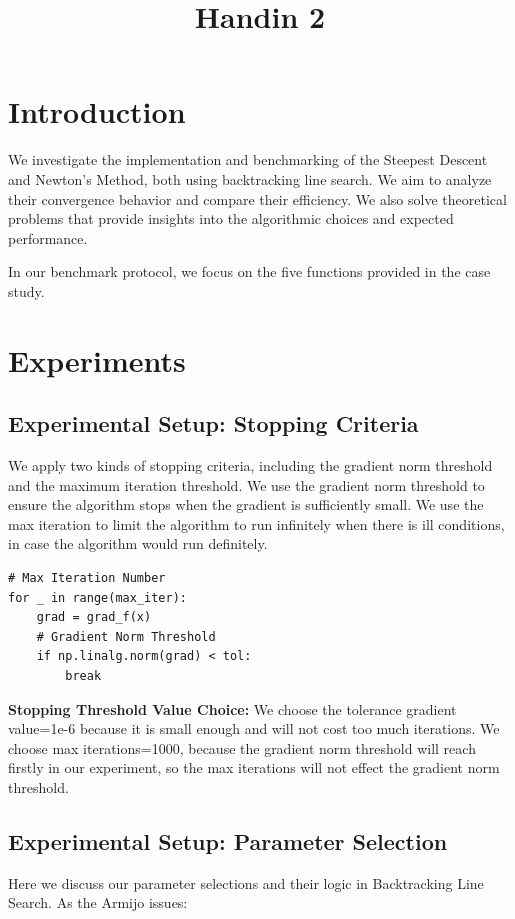 \documentclass[12pt]{article}
\title{Handin 2}
\begin{document}
\maketitle

\section{Introduction}

We investigate the implementation and benchmarking of the Steepest Descent and Newton's Method, both using backtracking line search. We aim to analyze their convergence behavior and compare their efficiency.  We also solve theoretical problems that provide insights into the algorithmic choices and expected performance. 

In our benchmark protocol, we focus on the five functions provided in the case study. 

\section{Experiments}

\subsection{Experimental Setup: Stopping Criteria}
We apply two kinds of stopping criteria, including the gradient norm threshold and the maximum iteration threshold. We use the gradient norm threshold to ensure the algorithm stops when the gradient is sufficiently small. We use the max iteration to limit the algorithm to run infinitely when there is ill conditions, in case the algorithm would run definitely.

\begin{lstlisting}
# Max Iteration Number
for _ in range(max_iter): 
    grad = grad_f(x)
    # Gradient Norm Threshold 
    if np.linalg.norm(grad) < tol:
        break
\end{lstlisting}

\textbf{Stopping Threshold Value Choice: }We choose the tolerance gradient value=1e-6 because it is small enough and will not cost too much iterations. We choose max iterations=1000, because the gradient norm threshold will reach firstly in our experiment, so the max iterations will not effect the gradient norm threshold. 

\subsection{Experimental Setup: Parameter Selection }
Here we discuss our parameter selections and their logic in Backtracking Line Search. As the Armijo issues:
\end{document}
